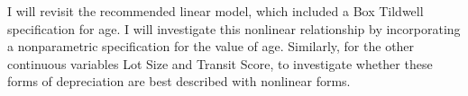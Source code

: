 %
%
%
%
%
%
%
%
%
%
%
%
%
%
%
%
%
%
I will revisit the recommended linear model,
which included a Box Tildwell specification for age. 
I will investigate this nonlinear relationship
by incorporating a nonparametric specification
for the value of age. 
Similarly, for the other continuous variables Lot Size and Transit Score, 
to investigate whether these forms of depreciation
are best described with nonlinear forms. 


